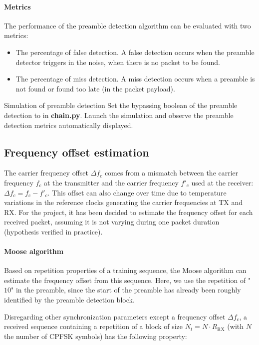 \paragraph{Metrics} The performance of the preamble detection algorithm can be evaluated with two metrics:
\begin{itemize}
    \item The percentage of false detection. A false detection occurs when the preamble detector triggers in the noise, when there is no packet to be found.
    \item The percentage of miss detection. A miss detection occurs when a preamble is not found or found too late (in the packet payload).
\end{itemize}

\begin{bclogo}[couleur = gray!20, arrondi = 0.2, logo=\bccrayon]{Simulation of preamble detection}
Set the bypassing boolean of the preamble detection to  in \textbf{chain.py}. Launch the simulation and observe the preamble detection metrics automatically displayed.
\end{bclogo}

\subsection{Frequency offset estimation}
The carrier frequency offset $\Delta f_c$ comes from a mismatch between the carrier frequency $f_c$ at the transmitter and the carrier frequency $f'_c$ used at the receiver: $\Delta f_c=f_c-f'_c$. This offset can also change over time due to temperature variations in the reference clocks generating the carrier frequencies at TX and RX. For the project, it has been decided to estimate the frequency offset for each received packet, assuming it is not varying during one packet duration (hypothesis verified in practice).

\paragraph{Moose algorithm} Based on repetition properties of a training sequence, the Moose algorithm can estimate the frequency offset from this sequence. Here, we use the repetition of "$10$" in the preamble, since the start of the preamble has already been roughly identified by the preamble detection block.

Disregarding other synchronization parameters except a frequency offset $\Delta f_c$, a received sequence containing a repetition of a block of size $N_t=N\cdot R_{\text{RX}}$ (with $N$ the number of CPFSK symbols) has the following property:

